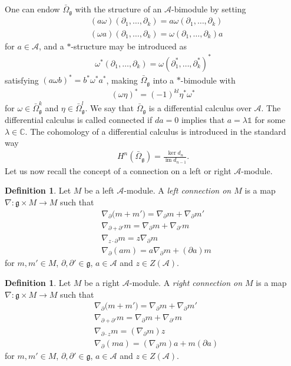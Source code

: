 \documentclass{amsart}
\newcommand{\complex}{\mathbb{C}}
\newcommand{\paraa}[1]{\big(#1\big)}
\newcommand{\im}{\operatorname{im}}
\theoremstyle{definition}
\newtheorem{definition}[theorem]{Definition}
\theoremstyle{remark}
\numberwithin{equation}{section}
\newcommand{\A}{\mathcal{A}}
\renewcommand{\mid}{\mathds{1}}
\renewcommand{\d}{\partial}
\newcommand{\g}{\mathfrak{g}}
\newcommand{\Omegabg}[1]{\bar{\Omega}^{#1}_{\g}}
\renewcommand{\emph}[1]{\textit{#1}}
\begin{document}
One can endow $\Omegabg{}$ with the structure of an $\A$-bimodule by
setting
\begin{align*}
  &(a\omega)(\d_1,\ldots,\d_k) = a\omega(\d_1,\ldots,\d_k)\\
  &(\omega a)(\d_1,\ldots,\d_k) = \omega(\d_1,\ldots,\d_k)a
\end{align*}
for $a\in\A$, and a $\ast$-structure may be introduced as
\begin{align*}
  \omega^\ast(\d_1,\ldots,\d_k) = \omega(\d_1^\ast,\ldots,\d_k^\ast)^\ast
\end{align*}
satisfying $(a\omega b)^\ast = b^\ast\omega^\ast a^\ast$, making
$\Omegabg{}$ into a $\ast$-bimodule with
\begin{align*}
  (\omega\eta)^\ast = (-1)^{kl}\eta^\ast\omega^\ast
\end{align*}
for $\omega\in\Omegabg{k}$ and $\eta\in\Omegabg{l}$. We say that
$\Omegabg{}$ is a differential calculus over $\A$. The differential
calculus is called connected if $da=0$ implies that
$a=\lambda\mid$ for some $\lambda\in\complex$.  The cohomology of a
differential calculus is introduced in the standard way
\begin{align*}
  H^n(\Omegabg{}) = \frac{\ker d_n}{\im d_{n-1}}.
\end{align*}
Let us now recall the concept of a connection on a left or right $\A$-module.
\begin{definition}
  Let $M$ be a left $\A$-module. A \emph{left connection on $M$} is a map
  $\nabla:\g\times M\to M$ such that
  \begin{align*}
    &\nabla_{\d}\paraa{m+m'} = \nabla_{\d}m + \nabla_{\d}m'\\
    &\nabla_{\d+\d'}m = \nabla_{\d}m + \nabla_{\d'}m\\
    &\nabla_{z\cdot \d}m = z\nabla_{\d}m\\
    &\nabla_{\d}(am) = a\nabla_{\d}m + (\d a)m
  \end{align*}
  for $m,m'\in M$, $\d,\d'\in\g$, $a\in\A$ and
  $z\in Z(\A)$.
\end{definition}

\begin{definition}
  Let $M$ be a right $\A$-module. A \emph{right connection on $M$} is a map
  $\nabla:\g\times M\to M$ such that
  \begin{align*}
    &\nabla_{\d}\paraa{m+m'} = \nabla_{\d}m + \nabla_{\d}m'\\
    &\nabla_{\d+\d'}m = \nabla_{\d}m + \nabla_{\d'}m\\
    &\nabla_{\d\cdot z}m = (\nabla_{\d}m)z\\
    &\nabla_{\d}(ma) = (\nabla_{\d}m)a + m(\d a)
  \end{align*}
  for $m,m'\in M$, $\d,\d'\in\g$, $a\in\A$ and
  $z\in Z(\A)$.
\end{definition}
\end{document}
